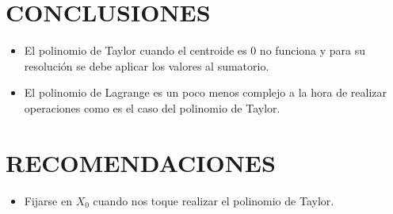 \documentclass[12pt]{article}
\begin{document}
\vspace{0.5cm}
\section*{CONCLUSIONES}
\begin{itemize}
    \item El polinomio de Taylor cuando el centroide es 0 no funciona y para su resolución se debe aplicar los valores al sumatorio. 
    \item El polinomio de Lagrange es un poco menos complejo a la hora de realizar operaciones como es el caso del polinomio de Taylor.
\end{itemize}
\vspace{0.5cm}
\section*{RECOMENDACIONES}
\begin{itemize}
    \item Fijarse en $X_0$ cuando nos toque realizar el polinomio de Taylor.
   
\end{itemize}

\renewcommand{\refname}{\MakeUppercase{REFERENCIAS}}


\end{document}
